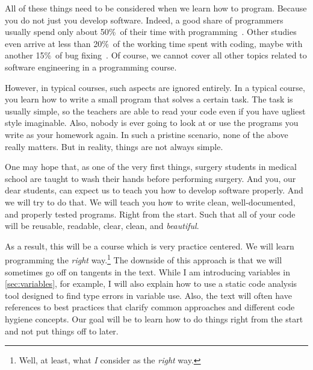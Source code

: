 All of these things need to be considered when we learn how to program.
Because you do not just  you develop software.
Indeed, a good share of programmers usually spend only about 50\%~of their time with programming~\cite{T2019MOSWBFDHOT2TMOSS,AS2019DS2OSRP}.
Other studies even arrive at less than 20\%~of the working time spent with coding, maybe with another 15\%~of bug fixing~\cite{MAGTOC2024EHFAP}.
Of course, we cannot cover all other topics related to software engineering in a programming course.

However, in typical courses, such aspects are ignored entirely.
In a typical course, you learn how to write a small program that solves a certain task.
The task is usually simple, so the teachers are able to read your code even if you have ugliest style imaginable.
Also, nobody is ever going to look at or use the programs you write as your homework again.
In such a pristine scenario, none of the above really matters.
But in reality, things are not always simple.

One may hope that, as one of the very first things, surgery students in medical school are taught to wash their hands before performing surgery.
And you, our dear students, can expect us to teach you how to develop software properly.
And we will try to do that.
We will teach you how to write clean, well-documented, and properly tested programs.
Right from the start.
Such that all of your code will be reusable, readable, clear, clean, and \emph{beautiful}.

As a result, this will be a course which is very practice centered.
We will learn programming the \emph{right} way.\footnote{%
Well, at least, what \emph{I} consider as the \emph{right} way.%
}
The downside of this approach is that we will sometimes go off on tangents in the text.
While I am introducing variables in \cref{sec:variables}, for example, I will also explain how to use a static code analysis tool designed to find type errors in variable use.
Also, the text will often have references to best practices that clarify common approaches and different code hygiene concepts.
Our goal will be to learn how to do things right from the start and not put things off to later.%
%
\endhsection%
%
